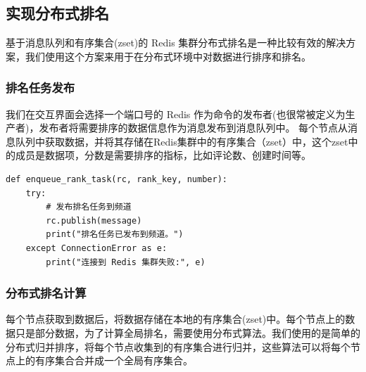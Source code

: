 \documentclass[12pt,hyperref,a4paper,UTF8]{ctexart}
\begin{document}
\subsection{实现分布式排名}

基于消息队列和有序集合(zset)的 Redis 集群分布式排名是一种比较有效的解决方案，我们使用这个方案来用于在分布式环境中对数据进行排序和排名。

\subsubsection{排名任务发布}

我们在交互界面会选择一个端口号的 Redis 作为命令的发布者(也很常被定义为生产者)，发布者将需要排序的数据信息作为消息发布到消息队列中。
每个节点从消息队列中获取数据，并将其存储在Redis集群中的有序集合（zset）中，这个zset中的成员是数据项，分数是需要排序的指标，比如评论数、创建时间等。

\begin{verbatim} 
def enqueue_rank_task(rc, rank_key, number):
    try:
        # 发布排名任务到频道
        rc.publish(message)
        print("排名任务已发布到频道。")
    except ConnectionError as e:
        print("连接到 Redis 集群失败:", e)
\end{verbatim} 

\subsubsection{分布式排名计算}

每个节点获取到数据后，将数据存储在本地的有序集合(zset)中。每个节点上的数据只是部分数据，为了计算全局排名，需要使用分布式算法。我们使用的是简单的分布式归并排序，将每个节点收集到的有序集合进行归并，这些算法可以将每个节点上的有序集合合并成一个全局有序集合。
\end{document}
